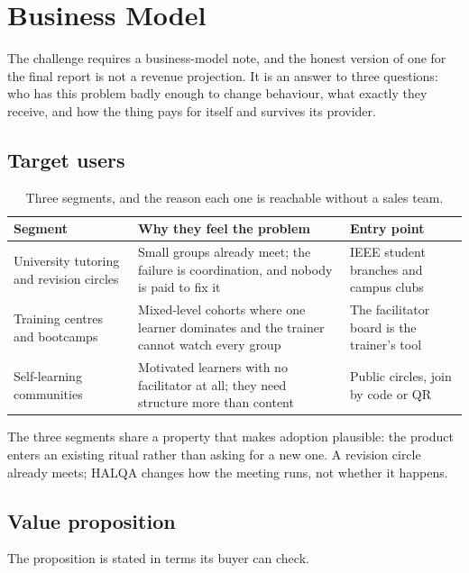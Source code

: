 \chapter{Business Model}
\label{ch:business}

The challenge requires a business-model note, and the honest version of one for the final
report is not a revenue projection. It is an answer to three questions: who has this
problem badly enough to change behaviour, what exactly they receive, and how the thing pays
for itself and survives its provider.

\section{Target users}

\begin{table}[htbp]
\centering
\caption{Three segments, and the reason each one is reachable without a sales team.}
\label{tab:segments}
\footnotesize
\begin{tabularx}{\textwidth}{@{}p{2.9cm}X p{4.2cm}@{}}
\toprule
\textbf{Segment} & \textbf{Why they feel the problem} & \textbf{Entry point} \\
\midrule
University tutoring and revision circles & Small groups already meet; the failure is
  coordination, and nobody is paid to fix it & IEEE student branches and campus clubs \\
Training centres and bootcamps & Mixed-level cohorts where one learner dominates and the
  trainer cannot watch every group & The facilitator board is the trainer's tool \\
Self-learning communities & Motivated learners with no facilitator at all; they need
  structure more than content & Public circles, join by code or QR \\
\bottomrule
\end{tabularx}
\end{table}

The three segments share a property that makes adoption plausible: the product enters an
existing ritual rather than asking for a new one. A revision circle already meets; HALQA
changes how the meeting runs, not whether it happens.

\section{Value proposition}

The proposition is stated in terms its buyer can check.

